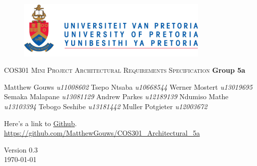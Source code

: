 \begin{titlepage}
\begin{center}
	\begin{figure}[t]
		\centering
		\includegraphics[width=350px]{UP_Logo.png}
	\end{figure}
	
\textsc{\LARGE COS301 Mini Project \newline\newline Architectural Requirements Specification}
		\textbf{\newline Group 5a} \\
		\begin{flushright} \large
			Matthew Gouws \emph{u11008602} \newline
			Tsepo Ntsaba \emph{u10668544} \newline
			Werner Mostert \emph{u13019695} \newline
			Semaka Malapane \emph{u13081129} \newline
			Andrew Parkes \emph{u12189139} \newline
			Ndumiso Mathe \emph{u13103394} \newline
			Tebogo Seshibe \emph{u13181442} \newline
			Muller Potgieter \emph{u12003672} \newline
		\end{flushright}
		
		\vfill
		
Here's a link to \href{https://github.com/MatthewGouws/COS301_Architectural_5a}{Github}.\\
	\url{https://github.com/MatthewGouws/COS301_Architectural_5a}		
		
		{\large Version 0.3 }
		\\
		{\large \today}
		
\end{center}
\end{titlepage}
